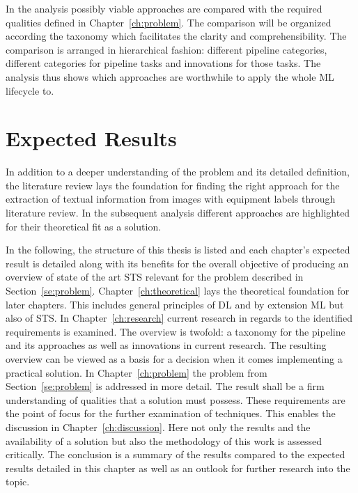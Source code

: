 In the analysis possibly viable approaches are compared with the required qualities defined
in Chapter~\ref{ch:problem}.
The comparison will be organized according the taxonomy which facilitates the clarity and
comprehensibility.
The comparison is arranged in hierarchical fashion: different pipeline categories,
different categories for pipeline tasks and innovations for those tasks.
The analysis thus shows which approaches are worthwhile to apply the whole \ac{ML} lifecycle to.

\section{Expected Results}
In addition to a deeper understanding of the problem and its detailed definition, the literature
review lays the foundation for finding the right approach for the extraction of textual
information from images with equipment labels through literature review.
In the subsequent analysis different approaches are highlighted for their theoretical fit as a solution.

In the following, the structure of this thesis is listed and each chapter's expected
result is detailed along with its benefits for the overall objective of producing an overview of
state of the art \ac{STS} relevant for the problem described in Section~\ref{se:problem}.
Chapter~\ref{ch:theoretical} lays the theoretical foundation for later chapters.
This includes general principles of \ac{DL} and by extension \ac{ML} but also of \ac{STS}.
In Chapter~\ref{ch:research} current research in regards to the
identified requirements is examined.
The overview is twofold: a taxonomy for the pipeline and its approaches as well as innovations in
current research.
The resulting overview can be viewed as a basis for a decision when it comes implementing a practical
solution.
In Chapter~\ref{ch:problem} the problem from Section~\ref{se:problem} is addressed in more detail.
The result shall be a firm understanding of qualities that a solution must possess.
These requirements are the point of focus for the further examination of techniques.
This enables the discussion in Chapter~\ref{ch:discussion}.
Here not only the results and the availability of a solution but also the methodology of this work
is assessed critically.
The conclusion is a summary of the results compared to the expected results detailed in this chapter
as well as an outlook for further research into the topic.
